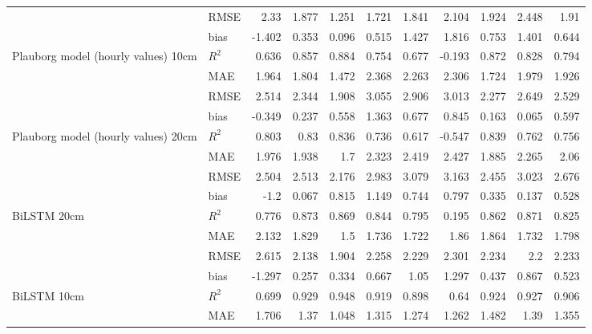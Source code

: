 \begin{tabular}{llrrrrrrrrr}
                                     & RMSE  &  2.33  &  1.877 &  1.251 & 1.721 & 1.841 &  2.104 &  1.924 & 2.448 &     1.91  \\
                                     & bias  & -1.402 &  0.353 &  0.096 & 0.515 & 1.427 &  1.816 &  0.753 & 1.401 &     0.644 \\
 Plauborg model (hourly values) 10cm & $R^2$ &  0.636 &  0.857 &  0.884 & 0.754 & 0.677 & -0.193 &  0.872 & 0.828 &     0.794 \\
                                     & MAE   &  1.964 &  1.804 &  1.472 & 2.368 & 2.263 &  2.306 &  1.724 & 1.979 &     1.926 \\
                                     & RMSE  &  2.514 &  2.344 &  1.908 & 3.055 & 2.906 &  3.013 &  2.277 & 2.649 &     2.529 \\
                                     & bias  & -0.349 &  0.237 &  0.558 & 1.363 & 0.677 &  0.845 &  0.163 & 0.065 &     0.597 \\
 Plauborg model (hourly values) 20cm & $R^2$ &  0.803 &  0.83  &  0.836 & 0.736 & 0.617 & -0.547 &  0.839 & 0.762 &     0.756 \\
                                     & MAE   &  1.976 &  1.938 &  1.7   & 2.323 & 2.419 &  2.427 &  1.885 & 2.265 &     2.06  \\
                                     & RMSE  &  2.504 &  2.513 &  2.176 & 2.983 & 3.079 &  3.163 &  2.455 & 3.023 &     2.676 \\
                                     & bias  & -1.2   &  0.067 &  0.815 & 1.149 & 0.744 &  0.797 &  0.335 & 0.137 &     0.528 \\
 BiLSTM 20cm                         & $R^2$ &  0.776 &  0.873 &  0.869 & 0.844 & 0.795 &  0.195 &  0.862 & 0.871 &     0.825 \\
                                     & MAE   &  2.132 &  1.829 &  1.5   & 1.736 & 1.722 &  1.86  &  1.864 & 1.732 &     1.798 \\
                                     & RMSE  &  2.615 &  2.138 &  1.904 & 2.258 & 2.229 &  2.301 &  2.234 & 2.2   &     2.233 \\
                                     & bias  & -1.297 &  0.257 &  0.334 & 0.667 & 1.05  &  1.297 &  0.437 & 0.867 &     0.523 \\
 BiLSTM 10cm                         & $R^2$ &  0.699 &  0.929 &  0.948 & 0.919 & 0.898 &  0.64  &  0.924 & 0.927 &     0.906 \\
                                     & MAE   &  1.706 &  1.37  &  1.048 & 1.315 & 1.274 &  1.262 &  1.482 & 1.39  &     1.355 \\

\end{tabular}
